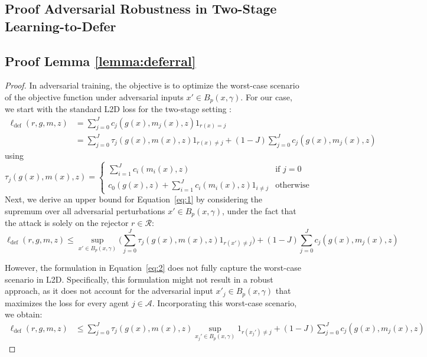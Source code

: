 \begin{appendices}
\section{Proof Adversarial Robustness in Two-Stage Learning-to-Defer}

\subsection{Proof Lemma \ref{lemma:deferral}}

\label{appendix:deferral}

\begin{proof}
In adversarial training, the objective is to optimize the worst-case scenario of the objective function under adversarial inputs \( x' \in B_p(x, \gamma) \). For our case, we start with the standard L2D loss for the two-stage setting \citep{mao2024regressionmultiexpertdeferral, montreuil2024twostagelearningtodefermultitasklearning}:
\begin{equation} \label{eq:1}
\begin{aligned}
    \ell_{\text{def}}(r, g,m,z) & = \sum_{j=0}^J c_j(g(x),m_j(x),z) 1_{r(x) = j} \\
    & = \sum_{j=0}^J \tau_j(g(x),m(x),z) 1_{r(x) \neq j} + (1-J) \sum_{j=0}^J c_j(g(x),m_j(x),z)
\end{aligned}
\end{equation}
using \begin{equation}
    \tau_j(g(x),m(x),z) =  \begin{cases}
         \sum_{i=1}^J c_i(m_i(x), z) & \text{if } j=0 \\
        c_0(g(x), z) + \sum_{i=1}^J c_i(m_i(x), z) 1_{i \neq j} & \text{otherwise}
    \end{cases}
\end{equation}
Next, we derive an upper bound for Equation~\eqref{eq:1} by considering the supremum over all adversarial perturbations \( x' \in B_p(x, \gamma) \), under the fact that the attack is solely on the rejector \( r \in \mathcal{R} \):
\begin{equation} \label{eq:2}
    \ell_{\text{def}}(r, g,m,z) \leq \sup_{x' \in B_p(x, \gamma)} \Big( \sum_{j=0}^J \tau_j(g(x),m(x),z) 1_{r(x') \neq j} \Big) + (1-J) \sum_{j=0}^J c_j(g(x),m_j(x),z)
\end{equation}

However, the formulation in Equation~\eqref{eq:2} does not fully capture the worst-case scenario in L2D. Specifically, this formulation might not result in a robust approach, as it does not account for the adversarial input \( x'_j \in B_p(x, \gamma) \) that maximizes the loss for every agent \( j \in \mathcal{A} \). Incorporating this worst-case scenario, we obtain:
\begin{equation}
\begin{aligned}
    \ell_{\text{def}}(r,g,m,z) & \leq \sum_{j=0}^J \tau_j(g(x),m(x),z) \sup_{x_j' \in B_p(x, \gamma)} 1_{r(x_j') \neq j} + (1-J) \sum_{j=0}^J c_j(g(x),m_j(x),z)
\end{aligned}
\end{equation}


\end{proof}
\end{appendices}
